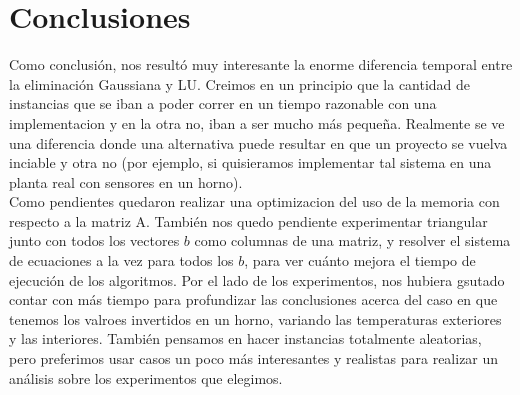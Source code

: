 \section{Conclusiones}

Como conclusión, nos resultó muy interesante la enorme diferencia temporal entre la eliminación Gaussiana y LU. Creimos en un principio que la cantidad de instancias que se iban a poder correr en un tiempo razonable con una implementacion y en la otra no, iban a ser mucho más pequeña. Realmente se ve una diferencia donde una alternativa puede resultar en que un proyecto se vuelva inciable y otra no (por ejemplo, si quisieramos implementar tal sistema en una planta real con sensores en un horno).\\

Como pendientes quedaron realizar una optimizacion del uso de la memoria con respecto a la matriz A. También nos quedo pendiente experimentar triangular junto con todos los vectores $b$ como columnas de una matriz, y resolver el sistema de ecuaciones a la vez para todos los $b$, para ver cuánto mejora el tiempo de ejecución de los algoritmos. Por el lado de los experimentos, nos hubiera gsutado contar con más tiempo para profundizar las conclusiones acerca del caso en que tenemos los valroes invertidos en un horno, variando las temperaturas exteriores y las interiores. También pensamos en hacer instancias totalmente aleatorias, pero preferimos usar casos un poco más interesantes y realistas para realizar un análisis sobre los experimentos que elegimos.  
